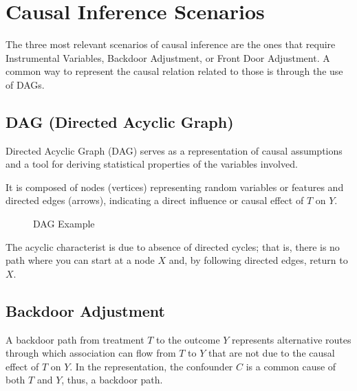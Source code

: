 \documentclass{article}
\numberwithin{equation}{section}
\begin{document}
\section{Causal Inference Scenarios}

The three most relevant scenarios of causal inference are the ones that require Instrumental Variables, Backdoor Adjustment, or Front Door Adjustment. A common way to represent the causal relation related to those is through the use of DAGs.

\subsection{DAG (Directed Acyclic Graph)}

Directed Acyclic Graph (DAG) serves as a representation of causal assumptions and a tool for deriving statistical properties of the variables involved.

It is composed of nodes (vertices) representing random variables or features and directed edges (arrows), indicating a direct influence or causal effect of $T$ on $Y$.

\begin{figure}[H]
    \centering
    \caption{DAG Example}
    \label{fig:dag_example}
\end{figure}

The acyclic characterist is due to absence of directed cycles; that is, there is no path where you can start at a node $X$ and, by following directed edges, return to $X$.

\subsection{Backdoor Adjustment}

A backdoor path from treatment $T$ to the outcome $Y$ represents alternative routes through which association can flow from $T$ to $Y$ that are not due to the causal effect of $T$ on $Y$. In the representation, the confounder $C$ is a common cause of both $T$ and $Y$, thus, a backdoor path.
\end{document}
